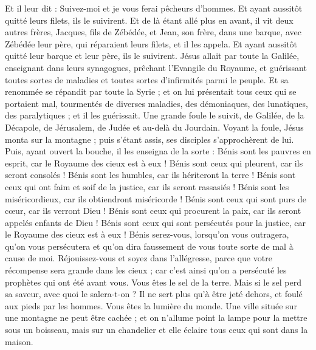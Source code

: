\begin{multicols}{2}
Et il leur dit : Suivez-moi et je vous ferai pêcheurs d'hommes.
Et ayant aussitôt quitté leurs filets, ils le suivirent.
Et de là étant allé plus en avant, il vit deux autres frères, Jacques, fils de Zébédée, et Jean, son frère, dans une barque, avec Zébédée leur père, qui réparaient leurs filets, et il les appela.
Et ayant aussitôt quitté leur barque et leur père, ils le suivirent.
Jésus allait par toute la Galilée, enseignant dans leurs synagogues, prêchant l'Evangile du Royaume, et guérissant toutes sortes de maladies et toutes sortes d'infirmités parmi le peuple.
Et sa renommée se répandit par toute la Syrie ; et on lui présentait tous ceux qui se portaient mal, tourmentés de diverses maladies, des démoniaques, des lunatiques, des paralytiques ; et il les guérissait.
Une grande foule le suivit, de Galilée, de la Décapole, de Jérusalem, de Judée et au-delà du Jourdain.
\VerseOne{}Voyant la foule, Jésus monta sur la montagne ; puis s'étant assis, ses disciples s'approchèrent de lui.
Puis, ayant ouvert la bouche, il les enseigna de la sorte :
Bénis sont les pauvres en esprit, car le Royaume des cieux est à eux !
Bénis sont ceux qui pleurent, car ils seront consolés !
Bénis sont les humbles, car ils hériteront la terre !
Bénis sont ceux qui ont faim et soif de la justice, car ils seront rassasiés !
Bénis sont les miséricordieux, car ils obtiendront miséricorde !
Bénis sont ceux qui sont purs de cœur, car ils verront Dieu !
Bénis sont ceux qui procurent la paix, car ils seront appelés enfants de Dieu !
Bénis sont ceux qui sont persécutés pour la justice, car le Royaume des cieux est à eux !
Bénis serez-vous, lorsqu'on vous outragera, qu'on vous persécutera et qu'on dira faussement de vous toute sorte de mal à cause de moi.
Réjouissez-vous et soyez dans l'allégresse, parce que votre récompense sera grande dans les cieux ; car c'est ainsi qu'on a persécuté les prophètes qui ont été avant vous.
Vous êtes le sel de la terre. Mais si le sel perd sa saveur, avec quoi le salera-t-on ? Il ne sert plus qu'à être jeté dehors, et foulé aux pieds par les hommes.
Vous êtes la lumière du monde. Une ville située sur une montagne ne peut être cachée ;
et on n'allume point la lampe pour la mettre sous un boisseau, mais sur un chandelier et elle éclaire tous ceux qui sont dans la maison.

\end{multicols}

